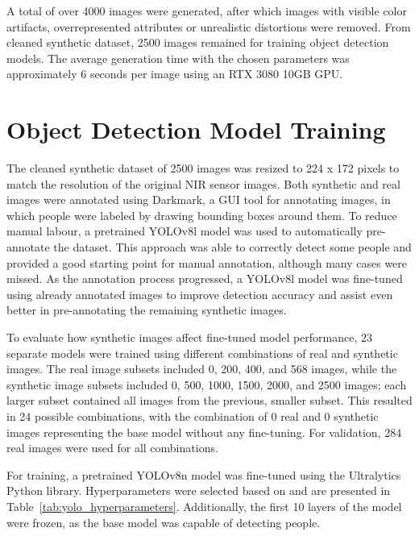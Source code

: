 A total of over 4000 images were generated, after which images with visible color artifacts, overrepresented attributes or unrealistic distortions were removed. From cleaned synthetic dataset, 2500 images remained for training object detection models. The average generation time with the chosen parameters was approximately 6 seconds per image using an RTX 3080 10GB GPU.

\section{Object Detection Model Training}
\label{sec:object_detection_training}

The cleaned synthetic dataset of 2500 images was resized to 224 x 172 pixels to match the resolution of the original NIR sensor images. Both synthetic and real images were annotated using Darkmark, a GUI tool for annotating images, in which people were labeled by drawing bounding boxes around them. To reduce manual labour, a pretrained YOLOv8l model was used to automatically pre-annotate the dataset. This approach was able to correctly detect some people and provided a good starting point for manual annotation, although many cases were missed. As the annotation process progressed, a YOLOv8l model was fine-tuned using already annotated images to improve detection accuracy and assist even better in pre-annotating the remaining synthetic images.

To evaluate how synthetic images affect fine-tuned model performance, 23 separate models were trained using different combinations of real and synthetic images. The real image subsets included 0, 200, 400, and 568 images, while the synthetic image subsets included 0, 500, 1000, 1500, 2000, and 2500 images; each larger subset contained all images from the previous, smaller subset. This resulted in 24 possible combinations, with the combination of 0 real and 0 synthetic images representing the base model without any fine-tuning.  For validation, 284 real images were used for all combinations.

For training, a pretrained YOLOv8n model was fine-tuned using the Ultralytics Python library. Hyperparameters were selected based on \cite{xin2024dartautomatedendtoendobject} and are presented in Table~\ref{tab:yolo_hyperparameters}. Additionally, the first 10 layers of the model were frozen, as the base model was capable of detecting people.

